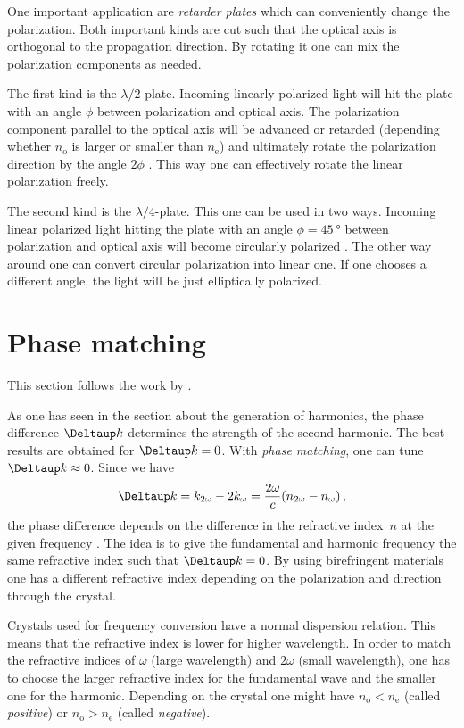 \documentclass[11pt, english, fleqn, DIV=15, headinclude, BCOR=2cm]{scrreprt}
\begin{document}
One important application are \emph{retarder plates} which can conveniently
change the polarization. Both important kinds are cut such that the optical
axis is orthogonal to the propagation direction. By rotating it one can mix the
polarization components as needed.

The first kind is the $\lambda/2$-plate. Incoming linearly polarized light will
hit the plate with an angle $\phi$ between polarization and optical axis. The
polarization component parallel to the optical axis will be advanced or
retarded (depending whether $n_\mathrm o$ is larger or smaller than $n_\mathrm
e$) and ultimately rotate the polarization direction by the angle $2 \phi$
\parencite[Figure~3.20]{meschede/optik_licht_laser/2008}. This way one can
effectively rotate the linear polarization freely.

The second kind is the $\lambda/4$-plate. This one can be used in two ways.
Incoming linear polarized light hitting the plate with an angle $\phi =
\SI{45}{\degree}$ between polarization and optical axis will become circularly
polarized \parencite[Figure~3.20]{meschede/optik_licht_laser/2008}. The other
way around one can convert circular polarization into linear one. If one
chooses a different angle, the light will be just elliptically polarized.

\section{Phase matching}

This section follows the work by
\textcite[Section~12.4.3]{meschede/optik_licht_laser/2008}.

As one has seen in the section about the generation of harmonics, the phase
difference $\Deltaup k$ determines the strength of the second harmonic. The
best results are obtained for $\Deltaup k = 0$. With \emph{phase matching}, one
can tune $\Deltaup k \approx 0$. Since we have
\[
    \Deltaup k
    = k_{2\omega} - 2 k_\omega
    = \frac{2\omega}{c} (n_{2\omega} - n_\omega) \,,
\]
the phase difference depends on the difference in the refractive index~$n$ at
the given frequency
\parencite[Equation~(12.12)]{meschede/optik_licht_laser/2008}. The idea is to
give the fundamental and harmonic frequency the same refractive index such that
$\Deltaup k = 0$. By using birefringent materials one has a different
refractive index depending on the polarization and direction through the
crystal.

Crystals used for frequency conversion have a normal dispersion relation. This
means that the refractive index is lower for higher wavelength. In order to
match the refractive indices of $\omega$ (large wavelength) and $2\omega$
(small wavelength), one has to choose the larger refractive index for the
fundamental wave and the smaller one for the harmonic. Depending on the crystal
one might have $n_\mathrm o < n_\mathrm e$ (called \emph{positive}) or
$n_\mathrm o > n_\mathrm e$ (called \emph{negative}).
\end{document}
